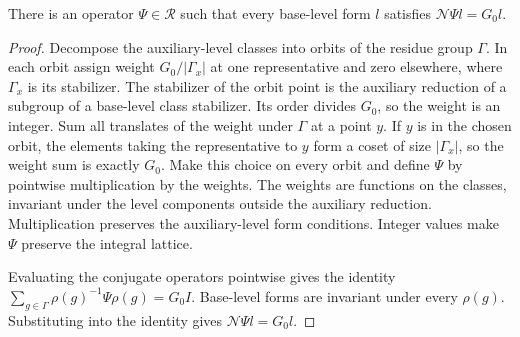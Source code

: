 \begin{lemma}
\label{lem:c-auxiliary-norm}
\emitthmsource
There is an operator $\Psi\in\mathcal R$ such that every base-level form $l$ satisfies $\mathcal N\Psi l=G_0 l$.
\end{lemma}
\begin{proof}
Decompose the auxiliary-level classes into orbits of the residue group $\Gamma$. In each orbit assign weight $G_0/|\Gamma_x|$ at one representative and zero elsewhere, where $\Gamma_x$ is its stabilizer.
The stabilizer of the orbit point is the auxiliary reduction of a subgroup of a base-level class stabilizer. Its order divides $G_0$, so the weight is an integer.
Sum all translates of the weight under $\Gamma$ at a point $y$. If $y$ is in the chosen orbit, the elements taking the representative to $y$ form a coset of size $|\Gamma_x|$, so the weight sum is exactly $G_0$.
Make this choice on every orbit and define $\Psi$ by pointwise multiplication by the weights.
The weights are functions on the classes, invariant under the level components outside the auxiliary reduction. Multiplication preserves the auxiliary-level form conditions. Integer values make $\Psi$ preserve the integral lattice.

Evaluating the conjugate operators pointwise gives the identity $\sum_{g\in\Gamma}\rho(g)^{-1}\Psi\rho(g)=G_0 I$.
Base-level forms are invariant under every $\rho(g)$. Substituting into the identity gives $\mathcal N\Psi l=G_0 l$.
\end{proof}


